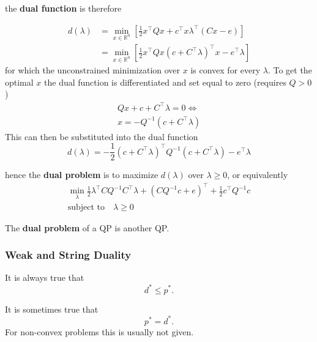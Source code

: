 the \textbf{dual function} is therefore

\begin{align*}
    d(\lambda) & = \min_{x\in\mathbb{R}^n}\left[\frac{1}{2}x^\top Q x + c^\top x \lambda^\top(Cx-e)\right]               \\
               & =  \min_{x\in\mathbb{R}^n}\left[\frac{1}{2}x^\top Q x {(c+C^\top\lambda)}^\top x - e^\top\lambda\right]
\end{align*}
for which the unconstrained minimization over $x$ is convex for every $\lambda$. To get the optimal $x$ the dual function is differentiated and set equal to zero (requires $Q>0$)
\begin{gather*}
    Qx + c +C^\top\lambda=0 \Leftrightarrow \\
    x = -Q^{-1}(c + C^\top\lambda)
\end{gather*}
This can then be substituted into the dual function
\begin{equation*}
    d(\lambda) = -\frac{1}{2}{\left(c+C^\top\lambda\right)}^\top Q^{-1}\left(c+C^\top\lambda\right) -e^\top\lambda
\end{equation*}

hence the \textbf{dual problem} is to maximize $d(\lambda)$ over $\lambda\geq0$, or equivalently
\begin{gather*}
    \min_{\lambda} \frac{1}{2}\lambda^\top C Q^{-1}C^\top\lambda+{\left(CQ^{-1}c+e\right)}^\top + \frac{1}{2}c^\top Q^{-1}c \\
    \text{subject to}\quad \lambda \geq 0
\end{gather*}

The \textbf{dual problem} of a QP is another QP.

\subsubsection{Weak and String Duality}


It is always true that
\begin{equation*}
    d^* \leq p^*.
\end{equation*}

\newpar{}

It is sometimes true that
\begin{equation*}
    p^* = d^*.
\end{equation*}
For non-convex problems this is usually not given.

\newpar{}

